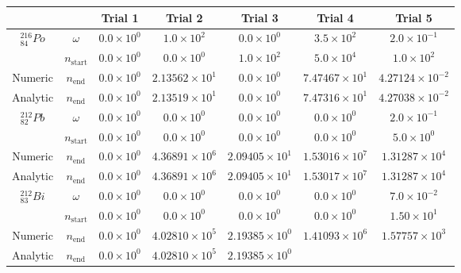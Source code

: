\begin{table}[h]
\begin{center}
\begin{longtable}{c c c c c c c}
\hline\hline
 &  & Trial 1 & Trial 2 & Trial 3 & Trial 4 & Trial 5 \\
\hline\hline
${}^{216}_{84}Po$ & $\omega$ & 
${0.0} \times 10^{0}$ & ${1.0} \times 10^{2}$ & ${0.0} \times 10^{0}$ &
${3.5} \times 10^{2}$ & ${2.0} \times 10^{-1}$ \\
 & $n_{\text{start}}$ & 
${0.0} \times 10^{0}$ & ${0.0} \times 10^{0}$ & ${1.0} \times 10^{2}$ & 
${5.0} \times 10^{4}$ & ${1.0} \times 10^{2}$ \\
Numeric & $n_{\text{end}}$ & 
${0.0} \times 10^{0}$ & ${2.13562} \times 10^{1}$ & ${0.0} \times 10^{0}$ & 
${7.47467} \times 10^{1}$ & ${4.27124} \times 10^{-2}$ \\
Analytic & $n_{\text{end}}$ & 
${0.0} \times 10^{0}$ & ${2.13519} \times 10^{1}$ & ${0.0} \times 10^{0}$ & 
${7.47316} \times 10^{1}$ & ${4.27038} \times 10^{-2}$ \\
\hline$
{}^{212}_{82}Pb$ & $\omega$ & 
${0.0} \times 10^{0}$ & ${0.0} \times 10^{0}$ & ${0.0} \times 10^{0}$ &
${0.0} \times 10^{0}$ & ${2.0} \times 10^{-1}$ \\
 & $n_{\text{start}}$ & 
${0.0} \times 10^{0}$ & ${0.0} \times 10^{0}$ & ${0.0} \times 10^{0}$ &
${0.0} \times 10^{0}$ & ${5.0} \times 10^{0}$ \\
Numeric & $n_{\text{end}}$ & 
${0.0} \times 10^{0}$ & ${4.36891} \times 10^{6}$ & ${2.09405} \times 10^{1}$ & 
${1.53016} \times 10^{7}$ & ${1.31287} \times 10^{4}$ \\
Analytic & $n_{\text{end}}$ & 
${0.0} \times 10^{0}$ & ${4.36891} \times 10^{6}$ & ${2.09405} \times 10^{1}$ & 
${1.53017} \times 10^{7}$ & ${1.31287} \times 10^{4}$ \\
\hline
${}^{212}_{83}Bi$ & $\omega$ & 
${0.0} \times 10^{0}$ & ${0.0} \times 10^{0}$ & ${0.0} \times 10^{0}$ &
${0.0} \times 10^{0}$ & ${7.0} \times 10^{-2}$ \\
 & $n_{\text{start}}$ & 
${0.0} \times 10^{0}$ & ${0.0} \times 10^{0}$ & ${0.0} \times 10^{0}$ &
${0.0} \times 10^{0}$ & ${1.50} \times 10^{1}$ \\
Numeric & $n_{\text{end}}$ & 
${0.0} \times 10^{0}$ & ${4.02810} \times 10^{5}$ & ${2.19385} \times 10^{0}$ & 
${1.41093} \times 10^{6}$ & ${1.57757} \times 10^{3}$ \\
Analytic & $n_{\text{end}}$ & 
${0.0} \times 10^{0}$ & ${4.02810} \times 10^{5}$ & ${2.19385} \times 10^{0}$ & 

\end{longtable}
\end{center}
\end{table}
